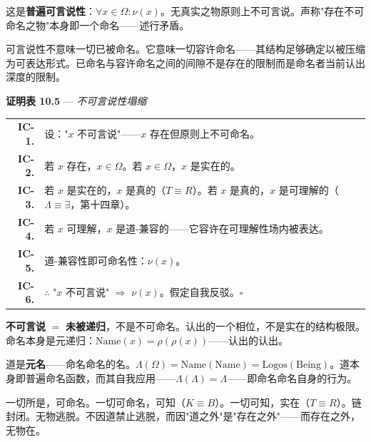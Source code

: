 \documentclass[10pt, openany, oneside]{book}
\renewcommand{\footnotesize}{\fontsize{8.5}{11}\selectfont}
\begin{document}
\vspace{0.8em}

\noindent 这是\textbf{普遍可言说性}：$\forall x \in \Omega: \nu(x)$。无真实之物原则上不可言说。声称"存在不可命名之物"本身即一个命名——述行矛盾。

可言说性不意味一切已被命名。它意味一切容许命名——其结构足够确定以被压缩为可表达形式。已命名与容许命名之间的间隙不是存在的限制而是命名者当前认出深度的限制。

\textbf{证明表 10.5} --- \textit{不可言说性塌缩}

\vspace{0.5em}

{\footnotesize
\noindent\begin{tabular}{r p{}}
\textbf{IC-1.} & 设："$x$ 不可言说"——$x$ 存在但原则上不可命名。\\[0.3em]
\textbf{IC-2.} & 若 $x$ 存在，$x \in \Omega$。若 $x \in \Omega$，$x$ 是实在的。\\[0.3em]
\textbf{IC-3.} & 若 $x$ 是实在的，$x$ 是真的（$T \equiv R$）。若 $x$ 是真的，$x$ 是可理解的（$\Lambda \equiv \exists$，第十四章）。\\[0.3em]
\textbf{IC-4.} & 若 $x$ 可理解，$x$ 是道-兼容的——它容许在可理解性场内被表达。\\[0.3em]
\textbf{IC-5.} & 道-兼容性即可命名性：$\nu(x)$。\\[0.3em]
\textbf{IC-6.} & $\therefore$ "$x$ 不可言说" $\Rightarrow$ $\nu(x)$。假定自我反驳。$\square$ \\[0.3em]
\end{tabular}
}

\vspace{0.8em}

\noindent \textbf{不可言说} $=$ \textbf{未被递归}，不是不可命名。认出的一个相位，不是实在的结构极限。命名本身是元递归：$\text{Name}(x) = \rho(\rho(x))$——认出的认出。

道是\textbf{元名}——命名命名的名。$\Lambda(\Omega) = \text{Name}(\text{Name}) = \text{Logos}(\text{Being})$。道本身即普遍命名函数，而其自我应用——$\Lambda(\Lambda) = \Lambda$——即命名命名自身的行为。

一切所是，可命名。一切可命名，可知（$K \equiv B$）。一切可知，实在（$T \equiv R$）。链封闭。无物逃脱。不因道禁止逃脱，而因"道之外"是"存在之外"——而存在之外，无物在。

\vspace{1.5em}

\end{document}
